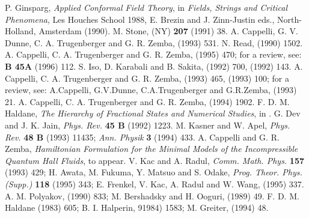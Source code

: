 \begin{references}
                P. Ginsparg, {\it Applied Conformal Field Theory},
                in {\it Fields, Strings and Critical Phenomena},
                Les Houches School 1988, E. Brezin and J. Zinn-Justin eds.,
                North-Holland, Amsterdam (1990).
 M. Stone, \AP (NY) {\bf 207} (1991) 38. 
 A. Cappelli, G. V. Dunne, C. A. Trugenberger and G. R.
                Zemba,  (1993) 531.
  N. Read,  (1990) 1502.
  A. Cappelli, C. A. Trugenberger and G. R. Zemba,
                 (1995) 470; for a review, see: 
                 {\bf B 45A} (1996) 112.
S. Iso, D. Karabali and B. Sakita,
                 (1992) 700,  (1992) 143.
  A. Cappelli, C. A. Trugenberger and G. R. Zemba,
                 (1993) 465,  (1993) 100;
                for a review, see:
                A.Cappelli, G.V.Dunne, C.A.Trugenberger and G.R.Zemba,
                 (1993) 21.
  A. Cappelli, C. A. Trugenberger and G. R. Zemba,
                 (1994) 1902.
  F. D. M. Haldane, {\it The Hierarchy of Fractional States and
                Numerical Studies}, in \cite{prange}.
 G. Dev and J. K. Jain, {\it Phys. Rev.} {\bf 45 B} (1992) 1223.
 M. Kasner and W. Apel, {\it Phys. Rev.} {\bf 48 B}
               (1993) 11435; {\it Ann. Physik} {\bf 3} (1994) 433.             
   A. Cappelli and G. R. Zemba, 
                {\it Hamiltonian Formulation for the Minimal Models
                of the Incompressible Quantum Hall Fluids}, to appear.
   V. Kac and A. Radul, {\it Comm. Math. Phys.} {\bf 157}
                (1993) 429; H. Awata, M. Fukuma, Y. Matsuo and
                S. Odake, {\it Prog. Theor. Phys. (Supp.)} {\bf 118}
                (1995) 343; E. Frenkel, V. Kac, A. Radul and W. Wang,
                 (1995) 337.
 A. M. Polyakov,  (1990) 833; 
               M. Bershadsky and H. Ooguri,  (1989) 49. 
F. D. M. Haldane  (1983) 605;
               B. I. Halperin,  91984) 1583;
               M. Greiter,  (1994) 48.
\end{references}

\vspace{2.cm}

